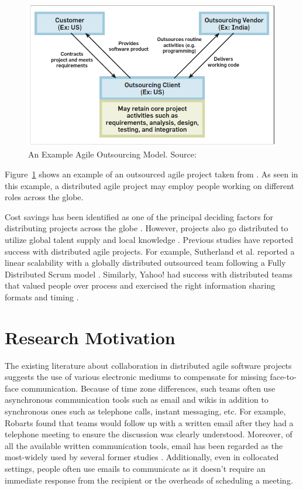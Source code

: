 \begin{figure}[bt]
	\centering
	\includegraphics[width=\textwidth]{Distributed.png}
    \caption{An Example Agile Outsourcing Model. Source: \cite{modified_agile}}
	\label{fig:distributed}
\end{figure}

Figure~\ref{fig:distributed} shows an example of an outsourced agile project taken from \cite{modified_agile}. As seen in this example, a distributed agile project may employ people working on different roles across the globe.

Cost savings has been identified as one of the principal deciding factors for distributing projects across the globe \cite{practical_considerations}. However, projects also go distributed to utilize global talent supply and local knowledge \cite{fully_distributed, modified_agile}. Previous studies have reported success with distributed agile projects. For example, Sutherland et al. reported a linear scalability with a globally distributed outsourced team following a Fully Distributed Scrum model \cite{fully_distributed}. Similarly, Yahoo! had success with distributed teams that valued people over process and exercised the right information sharing formats and timing \cite{yahoo}.


\section{Research Motivation}
The existing literature about collaboration in distributed agile software projects suggests the use of various electronic mediums to compensate for missing face-to-face communication. Because of time zone differences, such teams often use asynchronous communication tools such as email and wikis in addition to synchronous ones such as telephone calls, instant messaging, etc. For example, Robarts \cite{practical_considerations} found that teams would follow up with a written email after they had a telephone meeting to ensure the discussion was clearly understood. Moreover, of all the available written communication tools, email has been regarded as the most-widely used by several former studies \cite{collaboration_in, on_coord}. Additionally, even in collocated settings, people often use emails to communicate as it doesn't require an immediate response from the recipient or the overheads of scheduling a meeting.

